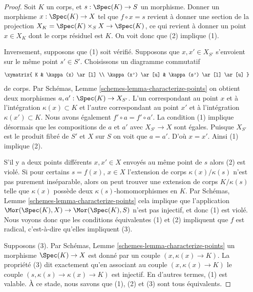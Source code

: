 \begin{proof}
Soit $K$ un corps, et $s : \Spec(K) \to S$ un morphisme.
Donner un morphisme $x : \Spec(K) \to X$ tel que $f \circ x = s$ revient
à donner une section de la projection
$X_K = \Spec(K) \times_S X \to \Spec(K)$, ce qui revient à donner un point
$x \in X_K$ dont le corps résiduel est $K$. On voit
donc que (2) implique (1).

\medskip\noindent Inversement,
 supposons que (1) soit vérifié. Supposons que $x, x' \in X_{S'}$ s'envoient
sur le même point $s' \in S'$. Choisissons un diagramme commutatif
$$
\xymatrix{
K & \kappa(x) \ar[l] \\
\kappa(x') \ar[u] & \kappa(s') \ar[l] \ar[u]
}
$$
de corps. Par Schémas, Lemme \ref{schemes-lemma-characterize-points} on obtient deux morphismes
$a, a' : \Spec(K) \to X_{S'}$. L'un correspondant au point $x$ et à l'intégration
$\kappa(x) \subset K$ et l'autre correspondant au point $x'$
et à l'intégration $\kappa(x') \subset K$. Nous avons également $f' \circ a = f' \circ a'$.
La condition (1) implique désormais que les compositions
de $a$ et $a'$ avec $X_{S'} \to X$ sont égales. Puisque
$X_{S'}$ est le produit fibré de $S'$ et $X$
sur $S$ on voit que $a = a'$. D'où $x = x'$. Ainsi
(1) implique (2).

\medskip\noindent
S'il y a deux points différents $x, x' \in X$ envoyés au même point de $s$
alors (2) est violé.
Si pour certains $s = f(x)$, $x \in X$ l'extension
de corps $\kappa(x)/\kappa(s)$ n'est pas purement inséparable,
alors on peut trouver une extension de corps $K/\kappa(s)$
telle que $\kappa(x)$ possède deux $\kappa(s)$-homomorphismes
en $K$. Par Schémas, Lemme \ref{schemes-lemma-characterize-points} cela
implique que l'application
$\Mor(\Spec(K), X) \to \Mor(\Spec(K), S)$ n'est pas injectif,
et donc (1) est violé. Nous voyons donc
que les conditions équivalentes (1) et (2) impliquent que
$f$ est radical, c'est-à-dire qu'elles impliquent (3).

\medskip\noindent
Supposons
(3). Par Schémas, Lemme \ref{schemes-lemma-characterize-points} un morphisme
$\Spec(K) \to X$ est donné par un couple $(x, \kappa(x) \to K)$. La propriété
(3) dit exactement qu'en associant au couple $(x, \kappa(x) \to K)$
le couple $(s, \kappa(s) \to \kappa(x) \to K)$ est injectif. En d’autres termes,
(1) est valable. À ce stade, nous savons que (1), (2)
et (3) sont tous équivalents.


\end{proof}

